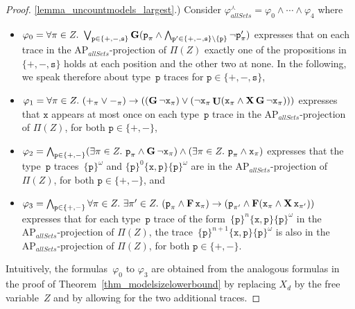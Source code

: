 \documentclass[dvipsnames,10pt,a4paper]{amsart}
\theoremstyle{definition}
\theoremstyle{remark}
\renewcommand{\phi}{\varphi}
\newcommand{\set}[1]{\{#1\}}
\newcommand{\F}{\mathop{\mathbf{F}\vphantom{a}}\nolimits}
\newcommand{\G}{\mathop{\mathbf{G}\vphantom{a}}\nolimits}
\DeclareMathOperator{\U}{\mathbf{U}}
\newcommand{\X}{\mathop{\mathbf{X}\vphantom{a}}\nolimits}
\newcommand{\ap}[0]{\mathrm{AP}}
\newcommand{\unidisvar}{X_d}
\newcommand{\largest}{\curlywedge}
\newcommand{\posprop}{\mathtt{+}}
\newcommand{\negprop}{\mathtt{-}}
\newcommand{\setprop}{\mathtt{s}}
\newcommand{\inprop}{\mathtt{x}}
\newcommand{\proposition}{\texttt{p}}
\newcommand{\allsets}{{\mathit{allSets}}}
\begin{document}
\begin{proof}
\ref{lemma_uncountmodels_largest}.)
Consider $\phi_\allsets^\largest = \phi_0 \wedge \cdots \wedge \phi_4$ where
\begin{itemize}
    \item $\phi_0 = \forall \pi \in Z.\ \bigvee_{\proposition \in \set{\posprop, \negprop,\setprop}} \G (\proposition_\pi \wedge \bigwedge_{\proposition' \in \set{\posprop, \negprop,\setprop} \setminus \set{\proposition}} \neg \proposition'_\pi )$ expresses that on each trace in the $\ap_\allsets$-projection of $\Pi(Z)$ exactly one of the propositions in $\set{\posprop, \negprop,\setprop}$ holds at each position and the other two at none. 
    In the following, we speak therefore about type~$\proposition$ traces for $\proposition \in \set{\posprop, \negprop,\setprop}$,

    \item $\phi_1 = \forall \pi \in Z.\  (\posprop_\pi \vee \negprop_\pi) \rightarrow ( (\G \neg \inprop_\pi) \vee (\neg \inprop_\pi \U ( \inprop_\pi \wedge \X \G \neg \inprop_\pi )))$
    expresses that $\inprop$ appears at most once on each type~$\proposition$ trace in the $\ap_\allsets$-projection of $\Pi(Z)$, for both $\proposition \in \set{\posprop,\negprop}$,

    \item $\phi_2 = \bigwedge_{\proposition \in \set{\posprop,\negprop}} (\exists \pi \in Z.\ \proposition_\pi\wedge \G\neg \inprop_\pi) \wedge (\exists\pi \in Z.\ \proposition_\pi \wedge \inprop_\pi)$ expresses that the type~$\proposition$ traces~$\set{\proposition}^\omega$ and $\set{\proposition}^0 \set{\inprop,\proposition} \set{\proposition}^\omega$ are in the $\ap_\allsets$-projection of $\Pi(Z)$, for both $\proposition \in \set{\posprop,\negprop}$, and


    \item $\phi_3 = \bigwedge_{\proposition \in \set{\posprop,\negprop}}\forall \pi \in Z.\ \exists\pi'\in Z.\ (\proposition_\pi \wedge \F \inprop_\pi) \rightarrow ( \proposition_{\pi'} \wedge  \F (\inprop_\pi \wedge \X \inprop_{\pi'}))$ expresses that for each type~$\proposition$ trace of the form~$\set{\proposition}^n \set{\inprop,\proposition} \set{\proposition}^\omega$ in the $\ap_\allsets$-projection of $\Pi(Z)$, the trace~$\set{\proposition}^{n+1} \set{\inprop,\proposition} \set{\proposition}^\omega$ is also in the $\ap_\allsets$-projection of $\Pi(Z)$, for both $\proposition \in \set{\posprop,\negprop}$.
    
\end{itemize}
Intuitively, the formulas~$\phi_0$ to $\phi_3$ are obtained from the analogous formulas in the proof of Theorem~\ref{thm_modelsizelowerbound} by replacing $\unidisvar$ by the free variable~$Z$ and by allowing for the two additional traces.


\end{proof}
\end{document}
